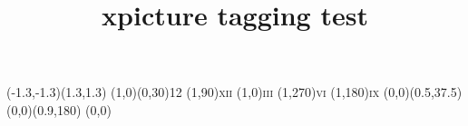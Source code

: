 \documentclass{article}
\title{xpicture tagging test}
\begin{document}
\setlength{\unitlength}{3cm}
\begin{Picture}(-1.3,-1.3)(1.3,1.3)
\polarreference
\degreesangles
\renewcommand{\Pictlabelsep}{0.1}
\multiPut(1,0)(0,30){12}{}
(1,90){\textsc{xii}}
(1,0){\textsc{iii}}
(1,270){\textsc{vi}}
(1,180){\textsc{ix}}
\thicklines
{}
\xtrivVECTOR(0,0)(0.5,37.5)
\xtrivVECTOR(0,0)(0.9,180)
\Put(0,0){}
\linethickness{4pt}
\end{Picture}
\end{document}
